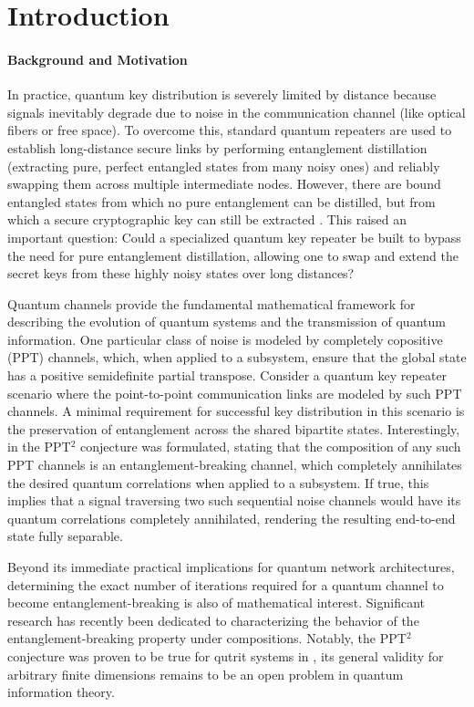 \chapter{Introduction}
\label{chap:intro}

\subsubsection{Background and Motivation}

In practice, quantum key distribution is severely limited by distance because signals inevitably degrade due to noise in the communication channel (like optical fibers or free space). To overcome this, standard quantum repeaters are used to establish long-distance secure links by performing entanglement distillation (extracting pure, perfect entangled states from many noisy ones) and reliably swapping them across multiple intermediate nodes. However, there are bound entangled states from which no pure entanglement can be distilled, but from which a secure cryptographic key can still be extracted \cite{horodecki2005secure}. This raised an important question: Could a specialized quantum key repeater be built to bypass the need for pure entanglement distillation, allowing one to swap and extend the secret keys from these highly noisy states over long distances? \cite{limitations2015} 

Quantum channels provide the fundamental mathematical framework for describing the evolution of quantum systems and the transmission of quantum information. One particular class of noise is modeled by completely copositive (PPT) channels, which, when applied to a subsystem, ensure that the global state has a positive semidefinite partial transpose. Consider a quantum key repeater scenario where the point-to-point communication links are modeled by such PPT channels. A minimal requirement for successful key distribution in this scenario is the preservation of entanglement across the shared bipartite states. Interestingly, in \cite{christandl2012ppt} the PPT$^2$ conjecture was formulated, stating that the composition of any such PPT channels is an entanglement-breaking channel, which completely annihilates the desired quantum correlations when applied to a subsystem. If true, this implies that a signal traversing two such sequential noise channels would have its quantum correlations completely annihilated, rendering the resulting end-to-end state fully separable.

Beyond its immediate practical implications for quantum network architectures, determining the exact number of iterations required for a quantum channel to become entanglement-breaking is also of mathematical interest. Significant research has recently been dedicated to characterizing the behavior of the entanglement-breaking property under compositions. Notably, the PPT$^2$ conjecture was proven to be true for qutrit systems in \cite{christandlWhenComposedMaps2019}, its general validity for arbitrary finite dimensions remains to be an open problem in quantum information theory. 

